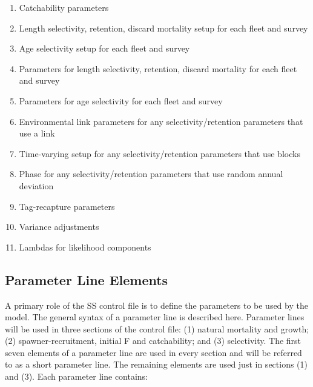 \begin{enumerate}
		\item Catchability parameters
		\\
		\item Length selectivity, retention, discard mortality setup for each fleet and survey
		\item Age selectivity setup for each fleet and survey
		\item Parameters for length selectivity, retention, discard mortality for each fleet and survey
		\item Parameters for age selectivity for each fleet and survey
		\item Environmental link parameters for any selectivity/retention parameters that use a link
		\item Time-varying setup for any selectivity/retention parameters that use blocks
		\item Phase for any selectivity/retention parameters that use random annual deviation
		\\
		\item Tag-recapture parameters
		\\
		\item Variance adjustments
		\item Lambdas for likelihood components
	\end{enumerate}

\subsection{Parameter Line Elements}
A primary role of the SS control file is to define the parameters to be used by the model.  The general syntax of a parameter line is described here.  Parameter lines will be used in three sections of the control file: (1) natural mortality and growth; (2) spawner-recruitment, initial F and catchability; and (3) selectivity.  The first seven elements of a parameter line are used in every section and will be referred to as a short parameter line.  The remaining elements are used just in sections (1) and (3).  Each parameter line contains:

